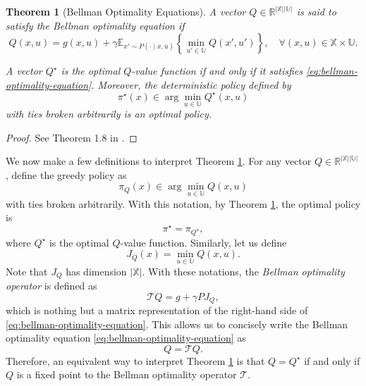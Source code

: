 \documentclass[
]{book}
\newtheorem{theorem}{Theorem}[chapter]
\theoremstyle{definition}
\theoremstyle{definition}
\theoremstyle{definition}
\theoremstyle{definition}
\theoremstyle{remark}
\begin{document}
\begin{theorem}[Bellman Optimality Equations]
\protect\hypertarget{thm:mdpbellmanoptimality}{}\label{thm:mdpbellmanoptimality}A vector \(Q \in \mathbb{R}^{|\mathbb{X}||\mathbb{U}|}\) is said to satisfy the Bellman optimality equation if
\begin{equation}
Q(x,u) = g(x,u) + \gamma \mathbb{E}_{x' \sim P(\cdot \mid x,u)} \left\{ \min_{u' \in \mathbb{U}} Q(x',u') \right\}, \quad \forall (x,u) \in \mathbb{X} \times \mathbb{U}.
\label{eq:bellman-optimality-equation}
\end{equation}

A vector \(Q^\star\) is the optimal \(Q\)-value function if and only if it satisfies \eqref{eq:bellman-optimality-equation}. Moreover, the deterministic policy defined by
\[
\pi^\star(x) \in \arg\min_{u \in \mathbb{U}} Q^\star(x,u)
\]
with ties broken arbitrarily is an optimal policy.
\end{theorem}

\begin{proof}
See Theorem 1.8 in \citep{agarwal22book-reinforcement}.
\end{proof}

We now make a few definitions to interpret Theorem \ref{thm:mdpbellmanoptimality}. For any vector \(Q \in \mathbb{R}^{|\mathbb{X}||\mathbb{U}|}\), define the greedy policy as
\begin{equation}
\pi_{Q}(x) \in \arg\min_{u \in \mathbb{U}} Q(x,u)
\label{eq:def-pi-Q}
\end{equation}
with ties broken arbitrarily. With this notation, by Theorem \ref{thm:mdpbellmanoptimality}, the optimal policy is
\[
\pi^\star = \pi_{Q^\star},
\]
where \(Q^\star\) is the optimal \(Q\)-value function. Similarly, let us define
\[
J_Q(x) = \min_{u \in \mathbb{U}} Q(x,u).
\]
Note that \(J_Q\) has dimension \(|\mathbb{X}|\). With these notations, the \emph{Bellman optimality operator} is defined as
\begin{equation}
\mathcal{T}Q = g + \gamma P J_Q,
\label{eq:bellman-optimality-operator}
\end{equation}
which is nothing but a matrix representation of the right-hand side of \eqref{eq:bellman-optimality-equation}. This allows us to concisely write the Bellman optimality equation \eqref{eq:bellman-optimality-equation} as
\begin{equation}
Q = \mathcal{T}Q.
\label{eq:mdp-fixed-point}
\end{equation}
Therefore, an equivalent way to interpret Theorem \ref{thm:mdpbellmanoptimality} is that \(Q = Q^\star\) if and only if \(Q\) is a fixed point to the Bellman optimality operator \(\mathcal{T}\).
\end{document}
